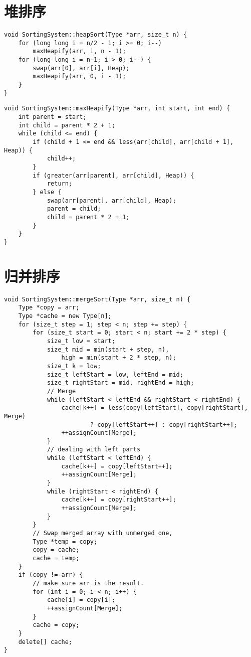 \section{堆排序}
\begin{lstlisting}[firstnumber=189 , caption=heapSort]
void SortingSystem::heapSort(Type *arr, size_t n) {
    for (long long i = n/2 - 1; i >= 0; i--)
        maxHeapify(arr, i, n - 1);
    for (long long i = n-1; i > 0; i--) {
        swap(arr[0], arr[i], Heap);
        maxHeapify(arr, 0, i - 1);
    }
}
\end{lstlisting}

\begin{lstlisting}[firstnumber=199]
void SortingSystem::maxHeapify(Type *arr, int start, int end) {
    int parent = start;
    int child = parent * 2 + 1;
    while (child <= end) {
        if (child + 1 <= end && less(arr[child], arr[child + 1], Heap)) {
            child++;
        }
        if (greater(arr[parent], arr[child], Heap)) {
            return;
        } else {
            swap(arr[parent], arr[child], Heap);
            parent = child;
            child = parent * 2 + 1;
        }
    }
}
\end{lstlisting}

\section{归并排序}
\begin{lstlisting}[firstnumber=217 , caption=mergeSort]
void SortingSystem::mergeSort(Type *arr, size_t n) {
    Type *copy = arr;
    Type *cache = new Type[n];
    for (size_t step = 1; step < n; step += step) {
        for (size_t start = 0; start < n; start += 2 * step) {
            size_t low = start;
            size_t mid = min(start + step, n), 
                high = min(start + 2 * step, n);
            size_t k = low;
            size_t leftStart = low, leftEnd = mid;
            size_t rightStart = mid, rightEnd = high;
            // Merge
            while (leftStart < leftEnd && rightStart < rightEnd) {
                cache[k++] = less(copy[leftStart], copy[rightStart], Merge)
                        ? copy[leftStart++] : copy[rightStart++];
                ++assignCount[Merge];
            }
            // dealing with left parts
            while (leftStart < leftEnd) {
                cache[k++] = copy[leftStart++];
                ++assignCount[Merge];
            }
            while (rightStart < rightEnd) {
                cache[k++] = copy[rightStart++];
                ++assignCount[Merge];
            }
        }
        // Swap merged array with unmerged one,
        Type *temp = copy;
        copy = cache;
        cache = temp;
    }
    if (copy != arr) {
        // make sure arr is the result.
        for (int i = 0; i < n; i++) {
            cache[i] = copy[i];
            ++assignCount[Merge];
        }
        cache = copy;
    }
    delete[] cache;
}
\end{lstlisting}

